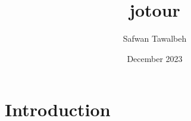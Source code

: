 \documentclass{article}
\title{jotour}
\author{Safwan Tawalbeh}
\date{December 2023}
\begin{document}
\maketitle

\section{Introduction}
\end{document}
